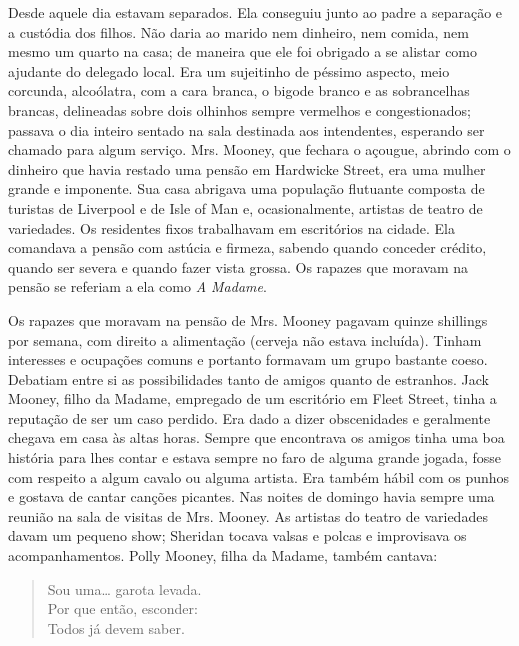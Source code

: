 Desde aquele dia estavam separados. Ela conseguiu junto ao padre a
separação e a custódia dos filhos. Não daria ao marido nem dinheiro,
nem comida, nem mesmo um quarto na casa; de maneira que ele foi
obrigado a se alistar como ajudante do delegado local. Era um
sujeitinho de péssimo aspecto, meio corcunda, alcoólatra, com a cara
branca, o bigode branco e as sobrancelhas brancas, delineadas sobre
dois olhinhos sempre vermelhos e congestionados; passava o dia
inteiro sentado na sala destinada aos intendentes, esperando ser
chamado para algum serviço. Mrs. Mooney, que fechara o açougue,
abrindo com o dinheiro que
havia restado uma pensão em Hardwicke Street, era uma mulher grande e
imponente. Sua casa abrigava uma população flutuante composta de
turistas de Liverpool e de Isle of Man e, ocasionalmente, artistas
de teatro de variedades. Os residentes fixos trabalhavam em
escritórios na cidade. Ela comandava a pensão com astúcia e firmeza,
sabendo quando conceder crédito, quando ser severa e quando fazer
vista grossa. Os rapazes que moravam na pensão se referiam a ela como
\textit{A Madame}.

Os rapazes que moravam na pensão de Mrs. Mooney pagavam quinze
shillings por semana, com direito a alimentação (cerveja não estava
incluída). Tinham interesses e ocupações comuns e portanto formavam um
grupo bastante coeso. Debatiam entre si as possibilidades tanto de
amigos quanto de estranhos. Jack Mooney, filho da Madame, empregado de
um escritório em Fleet Street, tinha a reputação de ser um caso
perdido. Era dado a dizer obscenidades e geralmente chegava em casa às
altas horas. Sempre que encontrava os amigos tinha uma boa história
para lhes contar e estava sempre no faro de alguma grande jogada,
fosse com respeito a algum cavalo ou alguma artista. Era também hábil
com os punhos e gostava de cantar canções picantes. Nas noites de
domingo havia sempre uma reunião na sala de visitas de Mrs. Mooney. As
artistas do teatro de variedades davam um pequeno show; Sheridan
tocava valsas e polcas e improvisava os acompanhamentos. Polly
Mooney, filha da Madame, também cantava:

\begin{verse}
Sou uma\ldots{} garota levada.\\
Por que então, esconder:\\
Todos já devem saber.
\end{verse}

